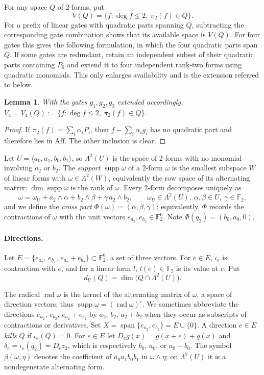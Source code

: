 \documentclass[11pt,a4paper]{article}
\theoremstyle{plain}
\newtheorem{lemma}[theorem]{Lemma}
\theoremstyle{remark}
\newcommand{\F}{\mathbb F_2}
\newcommand{\Aff}{\mathrm{Aff}}
\newcommand{\Span}{\operatorname{span}}
\newcommand{\supp}{\operatorname{supp}}
\newcommand{\rad}{\operatorname{rad}}
\newcommand{\Lam}{\Lambda^2}
\newcommand{\dU}{d_U}
\newcommand{\Dir}{E}
\begin{document}
For any space $Q$ of 2-forms, put
\[
 V(Q)=\{f:\deg f\le2,\ \pi_2(f)\in Q\}.
\]
For a prefix of linear gates with quadratic parts spanning $Q$, subtracting the corresponding gate combination shows that its available space is $V(Q)$. For four gates this gives the following formulation, in which the four quadratic parts span $Q$. If some gates are redundant, retain an independent subset of their quadratic parts containing $P_0$ and extend it to four independent rank-two forms using quadratic monomials. This only enlarges availability and is the extension referred to below.
\begin{lemma}\label{l4:lem:Qonly}
With the gates $g_1,g_2,g_3$ extended accordingly, $V_4=V_4(Q):=\{f:\deg f\le 2,\ \pi_2(f)\in Q\}$.
\end{lemma}

\begin{proof}
If $\pi_2(f)=\sum_i\alpha_iP_i$, then $f-\sum_i\alpha_ig_i$ has no quadratic part and therefore lies in $\Aff$. The other inclusion is clear.
\end{proof}


Let $U=\langle a_0,a_1,b_0,b_1\rangle$, so $\Lam(U)$ is the space of 2-forms with no monomial involving $a_2$ or $b_2$. The \emph{support} $\supp\omega$ of a 2-form $\omega$ is the smallest subspace $W$ of linear forms with $\omega\in\Lam(W)$, equivalently the row space of its alternating matrix; $\dim\supp\omega$ is the rank of $\omega$. Every 2-form decomposes uniquely as
\[
  \omega=\omega_U+a_2\wedge\alpha+b_2\wedge\beta+\gamma\,a_2\wedge b_2,\qquad \omega_U\in\Lam(U),\ \alpha,\beta\in U,\ \gamma\in\F,
\]
and we define the \emph{cross part} $\Phi(\omega)=(\alpha,\beta,\gamma)$; equivalently, $\Phi$ records the contractions of $\omega$ with the unit vectors $e_{a_2},e_{b_2}\in\F^6$. Note $\Phi(q_2)=(b_0,a_0,0)$.

\paragraph{Directions.} Let $\Dir=\{e_{a_2},\,e_{b_2},\,e_{a_2}+e_{b_2}\}\subset\F^6$, a set of three vectors. For $e\in\Dir$, $\iota_e$ is contraction with $e$, and for a linear form $l$, $l(e)\in\F$ is its value at $e$. Put
\[
  \dU(Q)=\dim\bigl(Q\cap\Lam(U)\bigr).
\]


The radical $\rad\omega$ is the kernel of the alternating matrix of $\omega$, a space of direction vectors; thus $\supp\omega=(\rad\omega)^\circ$. We sometimes abbreviate the directions $e_{a_2}$, $e_{b_2}$, $e_{a_2}+e_{b_2}$ by $a_2$, $b_2$, $a_2+b_2$ when they occur as subscripts of contractions or derivatives. Set $X=\Span\{e_{a_2},e_{b_2}\}=E\cup\{0\}$. A direction $e\in E$ \emph{kills} $Q$ if $\iota_e(Q)=0$.
For $e\in E$ let $D_eg(x)=g(x+e)+g(x)$ and $\delta_e=\iota_e(q_2)=D_ez_2$, which is respectively $b_0$, $a_0$, or $a_0+b_0$.
The symbol $\beta(\omega,\eta)$ denotes the coefficient of $a_0a_1b_0b_1$ in $\omega\wedge\eta$; on $\Lam(U)$ it is a nondegenerate alternating form.
\end{document}
